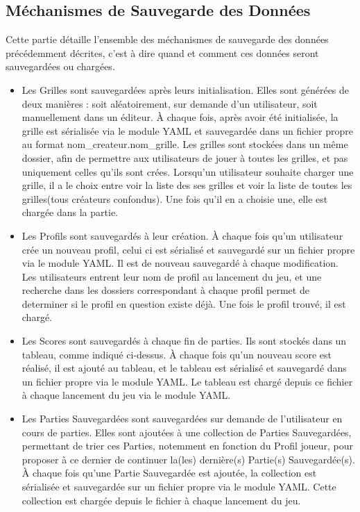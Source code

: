 \documentclass[11pt]{article}
\begin{document}
\subsection{Méchanismes de Sauvegarde des Données}
Cette partie détaille l'ensemble des méchanismes de sauvegarde des données précédemment décrites, c'est à dire quand et comment ces données seront sauvegardées ou chargées.

\begin{itemize}
    \item Les Grilles sont sauvegardées après leurs initialisation. Elles sont générées de deux manières : soit aléatoirement, sur demande d'un utilisateur, soit manuellement dans un éditeur. À chaque fois, après avoir été initialisée, la grille est sérialisée via le module YAML et sauvegardée dans un fichier propre au format nom\_createur.nom\_grille. Les grilles sont stockées dans un même dossier, afin de permettre aux utilisateurs de jouer à toutes les grilles, et pas uniquement celles qu'ils sont crées. Lorsqu'un utilisateur souhaite charger une grille, il a le choix entre voir la liste des ses grilles et voir la liste de toutes les grilles(tous créateurs confondus). Une fois qu'il en a choisie une, elle est chargée dans la partie. %
    \item Les Profils sont sauvegardés à leur création. À chaque fois qu'un utilisateur crée un nouveau profil, celui ci est sérialisé et sauvegardé sur un fichier propre via le module YAML. Il est de nouveau sauvegardé à chaque modification. Les utilisateurs entrent leur nom de profil au lancement du jeu, et une recherche dans les dossiers correspondant à chaque profil permet de determiner si le profil en question existe déjà. Une fois le profil trouvé, il est chargé.
    \item Les Scores sont sauvegardés à chaque fin de parties. Ils sont stockés dans un tableau, comme indiqué ci-dessus. À chaque fois qu'un nouveau score est réalisé, il est ajouté au tableau, et le tableau est sérialisé et sauvegardé dans un fichier propre via le module YAML. Le tableau est chargé depuis ce fichier à chaque lancement du jeu via le module YAML.
    \item Les Parties Sauvegardées sont sauvegardées sur demande de l'utilisateur en cours de parties. Elles sont ajoutées à une collection de Parties Sauvegardées, permettant de trier ces Parties, notemment en fonction du Profil joueur, pour proposer à ce dernier de continuer la(les) dernière(s) Partie(s) Sauvegardée(s). À chaque fois qu'une Partie Sauvegardée est ajoutée, la collection est sérialisée et sauvegardée sur un fichier propre via le module YAML. Cette collection est chargée depuis le fichier à chaque lancement du jeu.
\end{itemize}
\end{document}
